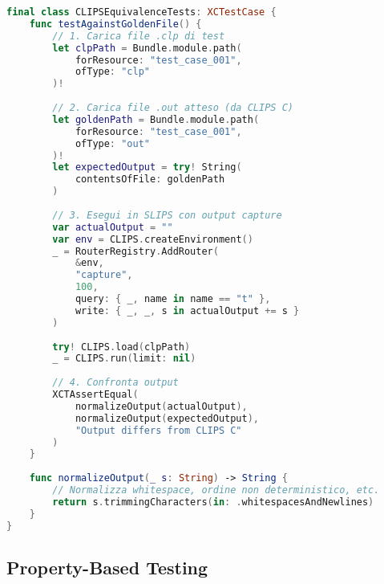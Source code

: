 \begin{lstlisting}[language=Swift]
final class CLIPSEquivalenceTests: XCTestCase {
    func testAgainstGoldenFile() {
        // 1. Carica file .clp di test
        let clpPath = Bundle.module.path(
            forResource: "test_case_001",
            ofType: "clp"
        )!
        
        // 2. Carica file .out atteso (da CLIPS C)
        let goldenPath = Bundle.module.path(
            forResource: "test_case_001",
            ofType: "out"
        )!
        let expectedOutput = try! String(
            contentsOfFile: goldenPath
        )
        
        // 3. Esegui in SLIPS con output capture
        var actualOutput = ""
        var env = CLIPS.createEnvironment()
        _ = RouterRegistry.AddRouter(
            &env,
            "capture",
            100,
            query: { _, name in name == "t" },
            write: { _, _, s in actualOutput += s }
        )
        
        try! CLIPS.load(clpPath)
        _ = CLIPS.run(limit: nil)
        
        // 4. Confronta output
        XCTAssertEqual(
            normalizeOutput(actualOutput),
            normalizeOutput(expectedOutput),
            "Output differs from CLIPS C"
        )
    }
    
    func normalizeOutput(_ s: String) -> String {
        // Normalizza whitespace, ordine non deterministico, etc.
        return s.trimmingCharacters(in: .whitespacesAndNewlines)
    }
}
\end{lstlisting}

\subsection{Property-Based Testing}

